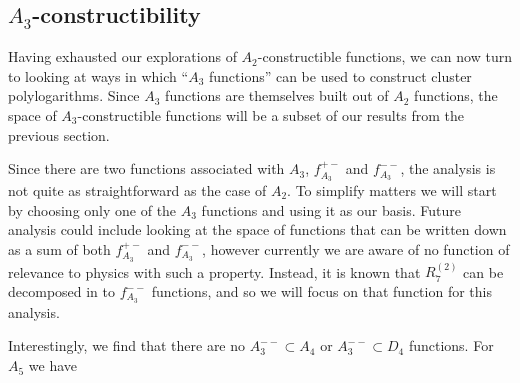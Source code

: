 \documentclass[11pt]{article}
\def\pdfeq#1{\texorpdfstring{$#1$}{a}}
\begin{document}
\subsection{\pdfeq{A_3}-constructibility}

Having exhausted our explorations of $A_2$-constructible functions, we can now turn to looking at ways in which ``$A_3$ functions'' can be used to construct cluster polylogarithms. Since $A_3$ functions are themselves built out of $A_2$ functions, the space of $A_3$-constructible functions will be a subset of our results from the previous section. 

Since there are two functions associated with $A_3$, $f_{A_3}^{+-}$ and $f_{A_3}^{--}$, the analysis is not quite as straightforward as the case of $A_2$. To simplify matters we will start by choosing only one of the $A_3$ functions and using it as our basis. Future analysis could include looking at the space of functions that can be written down as a sum of both $f_{A_3}^{+-}$ and $f_{A_3}^{--}$, however currently we are aware of no function of relevance to physics with such a property. Instead, it is known that $R^{(2)}_7$ can be decomposed in to $f_{A_3}^{--}$ \cite{Golden:2014xqa,Golden:2014xqf} functions, and so we will focus on that function for this analysis. 

Interestingly, we find that there are no $A_3^{--}\subset A_4$ or $A_3^{--}\subset D_4$ functions. For $A_5$ we have 
\end{document}
